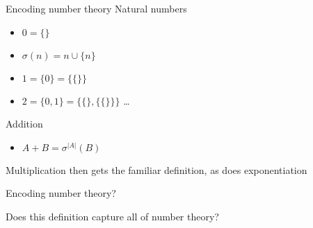 \documentclass[xcolor=svgnames]{beamer}
\begin{document}
\begin{frame}{Encoding number theory}
    Natural numbers
    \begin{itemize}
    \item $0 = \{\}$
    \item $\sigma(n) = n \cup \{n\}$
    \item $1 = \{0\} = \{\{\}\}$
    \item $2 = \{0,1\} = \{\{\}, \{\{\}\}\}$ \dots
    \end{itemize}

    Addition
    \begin{itemize}
    \item $A + B = \sigma^{|A|}(B)$
    \end{itemize}
    
    Multiplication then gets the familiar definition, as does exponentiation
\end{frame}

\begin{frame}{Encoding number theory?}
    \begin{center}
    \Huge Does this definition capture all of number theory?
    \end{center}
\end{frame}
\end{document}
